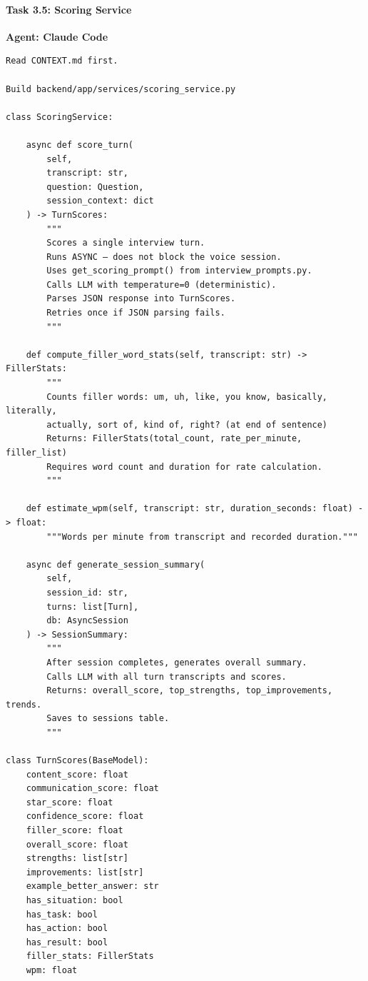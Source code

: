 \documentclass[
  11pt,
]{article}
\begin{document}
\hypertarget{task-3.5-scoring-service}{%
\paragraph{Task 3.5: Scoring Service}\label{task-3.5-scoring-service}}

\textbf{Agent: Claude Code}

\begin{lstlisting}
Read CONTEXT.md first.

Build backend/app/services/scoring_service.py

class ScoringService:

    async def score_turn(
        self,
        transcript: str,
        question: Question,
        session_context: dict
    ) -> TurnScores:
        """
        Scores a single interview turn.
        Runs ASYNC — does not block the voice session.
        Uses get_scoring_prompt() from interview_prompts.py.
        Calls LLM with temperature=0 (deterministic).
        Parses JSON response into TurnScores.
        Retries once if JSON parsing fails.
        """

    def compute_filler_word_stats(self, transcript: str) -> FillerStats:
        """
        Counts filler words: um, uh, like, you know, basically, literally,
        actually, sort of, kind of, right? (at end of sentence)
        Returns: FillerStats(total_count, rate_per_minute, filler_list)
        Requires word count and duration for rate calculation.
        """

    def estimate_wpm(self, transcript: str, duration_seconds: float) -> float:
        """Words per minute from transcript and recorded duration."""

    async def generate_session_summary(
        self,
        session_id: str,
        turns: list[Turn],
        db: AsyncSession
    ) -> SessionSummary:
        """
        After session completes, generates overall summary.
        Calls LLM with all turn transcripts and scores.
        Returns: overall_score, top_strengths, top_improvements, trends.
        Saves to sessions table.
        """

class TurnScores(BaseModel):
    content_score: float
    communication_score: float
    star_score: float
    confidence_score: float
    filler_score: float
    overall_score: float
    strengths: list[str]
    improvements: list[str]
    example_better_answer: str
    has_situation: bool
    has_task: bool
    has_action: bool
    has_result: bool
    filler_stats: FillerStats
    wpm: float


\end{lstlisting}
\end{document}
